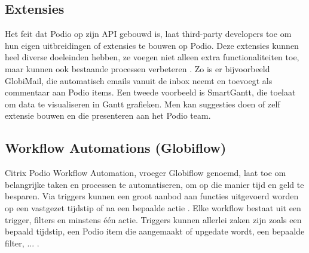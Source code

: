 \subsection{Extensies}


Het feit dat Podio op zijn API gebouwd is, laat third-party developers toe om hun eigen uitbreidingen of extensies te bouwen op Podio. Deze extensies kunnen heel diverse doeleinden hebben, ze voegen niet alleen extra functionaliteiten toe, maar kunnen ook bestaande processen verbeteren \autocite{PodioExtensions}. Zo is er bijvoorbeeld GlobiMail, die automatisch emails vanuit de inbox neemt en toevoegt als commentaar aan Podio items. Een tweede voorbeeld is SmartGantt, die toelaat om data te visualiseren in Gantt grafieken. Men kan suggesties doen of zelf extensie bouwen en die presenteren aan het Podio team. 



\subsection{Workflow Automations (Globiflow)}

Citrix Podio Workflow Automation, vroeger Globiflow genoemd, laat toe om belangrijke taken en processen te automatiseren, om op die manier tijd en geld te besparen. Via triggers kunnen een groot aanbod aan functies uitgevoerd worden op een vastgezet tijdstip of na een bepaalde actie \autocite{PodioWorkflowAutomation}. Elke workflow bestaat uit een trigger, filters en minstens één actie. Triggers kunnen allerlei zaken zijn zoals een bepaald tijdstip, een Podio item die aangemaakt of upgedate wordt, een bepaalde filter, ... \autocite{PodioWorkflowFeatures}.

